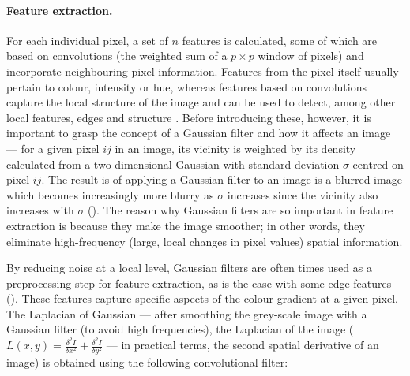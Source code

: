 \begin{figure}[!ht]
	\label{fig:segmentation-example-image-labels}
\end{figure}

\paragraph{Feature extraction.} For each individual pixel, a set of $n$ features is calculated, some of which are based on convolutions (the weighted sum of a $p \times p$ window of pixels) and incorporate neighbouring pixel information. Features from the pixel itself usually pertain to colour, intensity or hue, whereas features based on convolutions capture the local structure of the image and can be used to detect, among other local features, edges \cite{Canny1986-pi} and structure \cite{Sato1998-sy}. Before introducing these, however, it is important to grasp the concept of a Gaussian filter and how it affects an image --- for a given pixel $ij$ in an image, its vicinity is weighted by its density calculated from a two-dimensional Gaussian with standard deviation $\sigma$ centred on pixel $ij$. The result is of applying a Gaussian filter to an image is a blurred image which becomes increasingly more blurry as $\sigma$ increases since the vicinity also increases with $\sigma$ (). The reason why Gaussian filters are so important in feature extraction is because they make the image smoother; in other words, they eliminate high-frequency (large, local changes in pixel values) spatial information.

\begin{figure}[!ht]
	\label{fig:segmentation-example-gaussian-filter}
\end{figure}

By reducing noise at a local level, Gaussian filters are often times used as a preprocessing step for feature extraction, as is the case with some edge features (). These features capture specific aspects of the colour gradient at a given pixel. The Laplacian of Gaussian --- after smoothing the grey-scale image with a Gaussian filter (to avoid high frequencies), the Laplacian of the image ($L(x,y) = \frac{\delta^2I}{\delta x^2} + \frac{\delta^2I}{\delta y^2}$ --- in practical terms, the second spatial derivative of an image) is obtained using the following convolutional filter:
	
